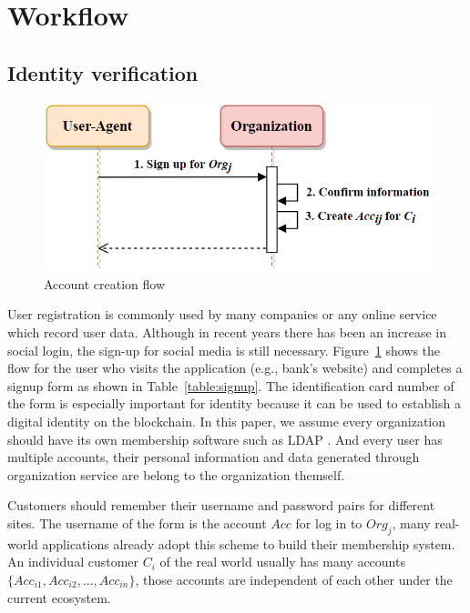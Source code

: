 \section{Workflow} \label{ssec:workflow}
    \subsection{Identity verification}
    \begin{figure}[htb]
        \centering
        \includegraphics[height=!,width=0.8\linewidth,keepaspectratio=true]{figures/account_creation.png}
        \caption{{\footnotesize Account creation flow}}
        \label{fig:accountCreation}
    \end{figure}
    User registration is commonly used by many companies or any online service which record user data. Although in recent years there has been an increase in social login, the sign-up for social media is still necessary. Figure~\ref{fig:accountCreation} shows the flow for the user who visits the application (e.g., bank's website) and completes a signup form as shown in Table~\ref{table:signup}. The identification card number of the form is especially important for identity because it can be used to establish a digital identity on the blockchain. In this paper, we assume every organization should have its own membership software such as LDAP . And every user has multiple accounts, their personal information and data generated through organization service are belong to the organization themself.\par
    
    
    \newpage

    Customers should remember their username and password pairs for different sites. The username of the form is the account \(Acc\) for log in to \(Org_j\), many real-world applications already adopt this scheme to build their membership system. An individual customer \(C_i\) of the real world usually has many accounts \(\{Acc_{i1}, Acc_{i2}, ..., Acc_{in}\}\), those accounts are independent of each other under the current ecosystem.\par

